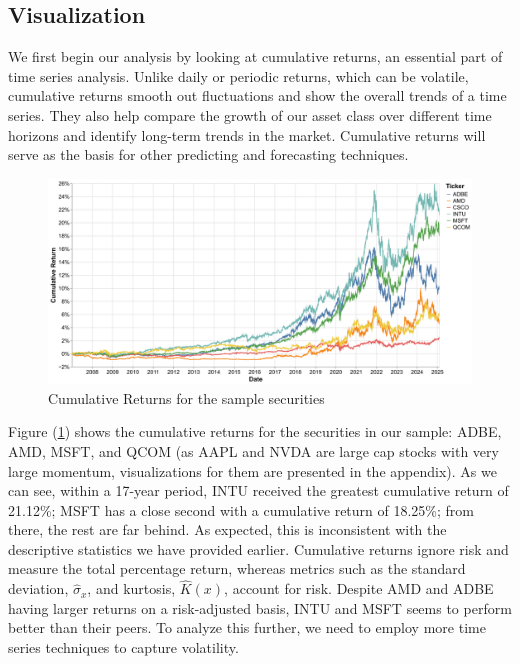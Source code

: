 \documentclass[12pt]{article}
\begin{document}
\subsection{Visualization}
We first begin our analysis by looking at cumulative returns, an essential part of time series analysis. Unlike daily or periodic returns, which can be volatile, cumulative returns smooth out fluctuations and show the overall trends of a time series. They also help compare the growth of our asset class over different time horizons and identify long-term trends in the market. Cumulative returns will serve as the basis for other predicting and forecasting techniques.
\begin{figure}[h]
	\centering
	\includegraphics[width=0.9\linewidth]{plots/cumulative_returns.png}
	\caption{Cumulative Returns for the sample securities}
	\label{fig:cum_returns}
\end{figure}
Figure (\ref{fig:cum_returns}) shows the cumulative returns for the securities in our sample: ADBE, AMD, MSFT, and QCOM (as AAPL and NVDA are large cap stocks with very large momentum, visualizations for them are presented in the appendix). As we can see, within a 17-year period, INTU received the greatest cumulative return of 21.12\%; MSFT has a close second with a cumulative return of 18.25\%; from there, the rest are far behind. As expected, this is inconsistent with the descriptive statistics we have provided earlier. Cumulative returns ignore risk and measure the total percentage return, whereas metrics such as the standard deviation, $\hat{\sigma}_x$, and kurtosis, $\hat{K}(x)$, account for risk. Despite AMD and ADBE having larger returns on a risk-adjusted basis, INTU and MSFT seems to perform better than their peers. To analyze this further, we need to employ more time series techniques to capture volatility.
\end{document}
